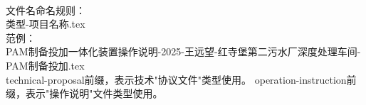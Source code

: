 \documentclass[UTF8,a4paper,12pt,titlepage]{ctexart}
\begin{document}
\quad\\
文件名命名规则：\\
类型-项目名称.tex\\
范例：\\
PAM制备投加一体化装置操作说明-2025-王远望-红寺堡第二污水厂深度处理车间-PAM制备投加.tex\\

technical-proposal前缀，表示技术"协议文件"类型使用。
operation-instruction前缀，表示"操作说明"文件类型使用。
\end{document}
